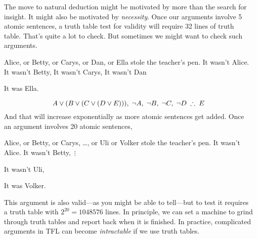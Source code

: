 The move to natural deduction might be motivated by more than the search for insight. It might also be motivated by \emph{necessity}. Once our arguments involve 5 atomic sentences,  a truth table test for validity will require 32 lines of truth table. That's quite a lot to check. But sometimes we might want to check such arguments. 
\begin{center}
\begin{earg}
\prem Alice, or Betty, or Carys, or Dan, or Ella stole the teacher's pen.
\prem It wasn't Alice.
\prem It wasn't Betty,
\prem It wasn't Carys,
\prem It wasn't Dan
\item [\therefore] It was Ella. 
\end{earg}
\end{center}
$$A\eor(B\eor (C\eor (D\eor E))),\;\enot A,\;\enot B,\;\enot C,\;\enot D\;\therefore\;E$$
And that will increase exponentially as more atomic sentences get added. Once an argument involves 20 atomic sentences, 
\begin{center}
\begin{earg}
\prem Alice, or Betty, or Carys, \ldots, or Uli or Volker stole the teacher's pen.
\prem It wasn't Alice.
\prem It wasn't Betty,
\prem\,$\vdots$
\item [] It wasn't Uli,
\item [\therefore] It was Volker. 
\end{earg}
\end{center}
This argument is also valid---as you might be able to tell---but to test it requires a truth table with $2^{20} = 1048576$ lines. In principle, we can set a machine to grind through truth tables and report back when it is finished. In practice, complicated arguments in TFL can become \emph{intractable} if we use truth tables.


